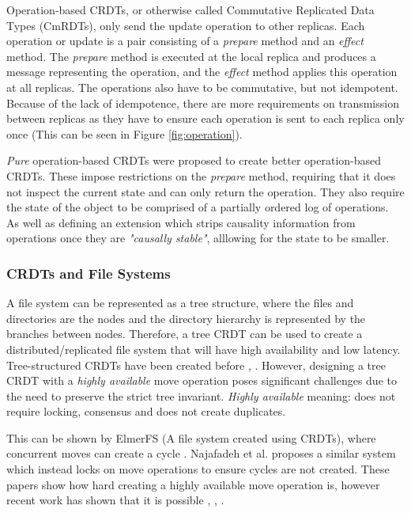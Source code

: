 \documentclass[12pt]{article}
\begin{document}
Operation-based CRDTs, or otherwise called Commutative Replicated Data Types (CmRDTs), only send the update operation to other replicas. Each operation or update is a pair consisting of a \textit{prepare} method and an \textit{effect} method. The \textit{prepare} method is executed at the local replica and produces a message representing the operation, and the \textit{effect} method applies this operation at all replicas\cite{10.1007/978-3-642-24550-3_29}. The operations also have to be commutative, but not idempotent. Because of the lack of idempotence, there are more requirements on transmission between replicas as they have to ensure each operation is sent to each replica only once (This can be seen in Figure \ref{fig:operation}). \par

\textit{Pure} operation-based CRDTs were proposed to create better operation-based CRDTs\cite{10.1007/978-3-662-43352-2_11}. These impose restrictions on the \textit{prepare} method, requiring that it does not inspect the current state and can only return the operation. They also require the state of the object to be comprised of a partially ordered log of operations. As well as defining an extension which strips causality information from operations once they are \textit{"causally stable"}\cite{10.1007/978-3-662-43352-2_11}, alllowing for the state to be smaller.

\subsubsection{CRDTs and File Systems}
A file system can be represented as a tree structure, where the files and directories are the nodes and the directory hierarchy is represented by the branches between nodes. Therefore, a tree CRDT can be used to create a distributed/replicated file system that will have high availability and low latency. Tree-structured CRDTs have been created before \cite{10.1145/2757667.2757683}, \cite{kleppmann2018automerge}. However, designing a tree CRDT with a \textit{highly available} move operation poses significant challenges due to the need to preserve the strict tree invariant. \textit{Highly available} meaning: does not require locking, consensus and does not create duplicates.   \par

This can be shown by ElmerFS (A file system created using CRDTs), where concurrent moves can create a cycle \cite{10.1145/3465332.3470872}. Najafadeh et al. \cite{Najafzadeh0E18} proposes a similar system which instead locks on move operations to ensure cycles are not created. These papers show how hard creating a highly available move operation is, however recent work has shown that it is possible \cite{9563274}, \cite{https://doi.org/10.48550/arxiv.2103.04828}, \cite{https://doi.org/10.48550/arxiv.1805.04263}. \par
\end{document}
